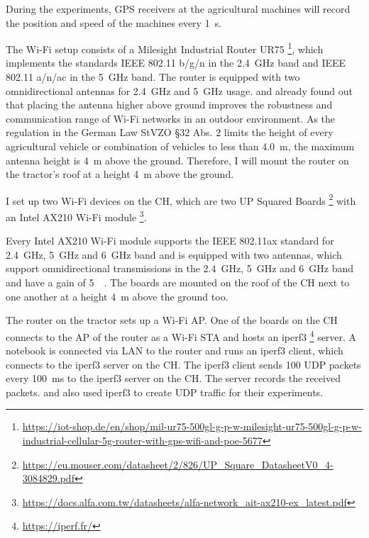 During the experiments, \ac{GPS} receivers at the agricultural machines will record the position and speed of the machines every \SI{1}{\second}.

The Wi-Fi setup consists of a Milesight Industrial Router UR75 \footnote{\url{https://iot-shop.de/en/shop/mil-ur75-500gl-g-p-w-milesight-ur75-500gl-g-p-w-industrial-cellular-5g-router-with-gps-wifi-and-poe-5677}}, which implements the standards
IEEE 802.11 b/g/n in the \SI{2.4}{\giga\hertz} band and IEEE 802.11 a/n/ac in the \SI{5}{\giga\hertz} band.
The router is equipped with two omnidirectional antennas for \SI{2.4}{\giga\hertz} and \SI{5}{\giga\hertz} usage.
\textcite{brinkhoff_characterization_2017} and \textcite{paul_characterizing_2011} already found out that placing the antenna higher above ground improves
the robustness and communication range of Wi-Fi networks in an outdoor environment.
As the regulation in the German Law StVZO §32 Abs. 2 limits the height of
every agricultural vehicle or combination of vehicles to less than \SI{4.0}{\metre}, the maximum antenna height is \SI{4}{\metre} above the ground. Therefore, I will mount the router on the tractor's roof at a height \SI{4}{\metre} above the ground.


I set up two Wi-Fi devices on the \ac{CH}, which are two UP Squared Boards \footnote{\url{https://eu.mouser.com/datasheet/2/826/UP_Square_DatasheetV0_4-3084829.pdf}} with an Intel AX210 Wi-Fi module \footnote{\url{https://docs.alfa.com.tw/datasheets/alfa-network_ait-ax210-ex_latest.pdf}}.

Every Intel AX210 Wi-Fi module supports the IEEE 802.11ax standard for \SI{2.4}{\giga\hertz}, \SI{5}{\giga\hertz} and \SI{6}{\giga\hertz} band and is equipped with two antennas,
which support omnidirectional transmissions in the \SI{2.4}{\giga\hertz}, \SI{5}{\giga\hertz} and \SI{6}{\giga\hertz} band and have a gain of \SI{5}{\deci\belisotopic}.
The boards are mounted on the roof of the \ac{CH} next to one another at a height \SI{4}{\metre} above the ground too.

The router on the tractor sets up a Wi-Fi \ac{AP}.
One of the boards on the \ac{CH} connects to the \ac{AP} of the router as a Wi-Fi \ac{STA} and hosts an iperf3 \footnote{\url{https://iperf.fr/}} server.
A notebook is connected via LAN to the router and runs an iperf3 client, which connects to the iperf3 server on the \ac{CH}.
The iperf3 client sends \SI{100}{\byte} \ac{UDP} packets every \SI{100}{\milli\second} to the iperf3 server on the \ac{CH}.
The server records the received packets.
\textcite{paul_characterizing_2011} and \textcite{klingler_agriculture_2018} also used iperf3 to create \ac{UDP} traffic for their experiments.

